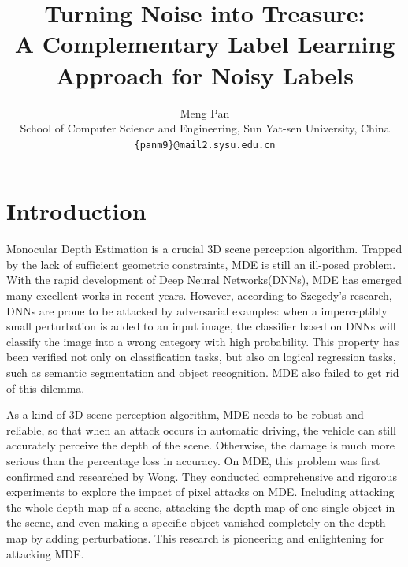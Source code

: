 \documentclass[10pt,twocolumn,letterpaper]{article}
\begin{document}
\title{Turning Noise into Treasure:\\ A Complementary Label Learning Approach for Noisy Labels}

\author{Meng Pan\\ School of Computer Science and Engineering, Sun Yat-sen University, China\\{\tt\small \{panm9\}@mail2.sysu.edu.cn}}

\maketitle

\begin{abstract}
\end{abstract}

\section{Introduction}
Monocular Depth Estimation is a crucial 3D scene perception algorithm. 
Trapped by the lack of sufficient geometric constraints, 
MDE is still an ill-posed problem. With the rapid development of 
Deep Neural Networks(DNNs), MDE has emerged many excellent works 
in recent years. However, according to Szegedy's research, DNNs are 
prone to be attacked by adversarial examples: when a imperceptibly 
small perturbation is added to an input image, the classifier 
based on DNNs will classify the image into a wrong category with high probability. 
This property has been verified not only on classification tasks, 
but also on logical regression tasks, such as semantic segmentation and 
object recognition. MDE also failed to get rid of this dilemma.

As a kind of 3D scene perception algorithm, MDE needs to be 
robust and reliable, so that when an attack occurs in automatic 
driving, the vehicle can still accurately perceive the depth 
of the scene. Otherwise, the damage is much more serious than 
the percentage loss in accuracy. On MDE, this problem was 
first confirmed and researched by Wong. They conducted 
comprehensive and rigorous experiments to explore the impact 
of pixel attacks on MDE. Including attacking the whole 
depth map of a scene, attacking the depth map of one 
single object in the scene, and even making a specific 
object vanished completely on the depth map by 
adding perturbations. This research is pioneering and 
enlightening for attacking MDE.
\end{document}
